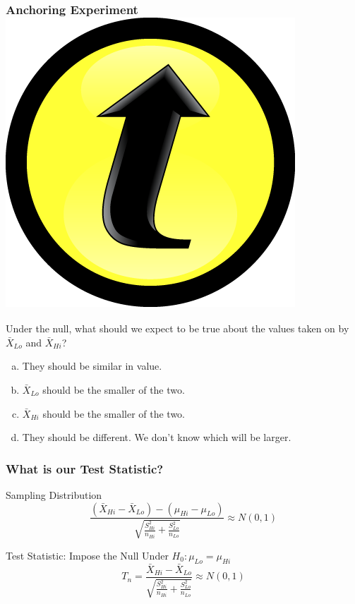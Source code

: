 \documentclass[handout]{beamer}
\begin{document}
\begin{frame}
	\frametitle{Anchoring Experiment\hfill \includegraphics[scale = 0.05]{./images/clicker}}
 
Under the null, what should we expect to be true about the values taken on by $\bar{X}_{Lo}$ and $\bar{X}_{Hi}$?

\vspace{1em}

	\begin{enumerate}[(a)]
		\item They should be similar in value.
		\item $\bar{X}_{Lo}$ should be the smaller of the two.
		\item $\bar{X}_{Hi}$ should be the smaller of the two.
		\item They should be different. We don't know which will be larger.
	\end{enumerate}
\end{frame}

\begin{frame}
\frametitle{What is our Test Statistic?}
\begin{block}{Sampling Distribution}
		$$\frac{\left(\bar{X}_{Hi} - \bar{X}_{Lo}\right) - \left(\mu_{Hi} - \mu_{Lo}\right)}{\sqrt{\frac{S_{Hi}^2}{n_{Hi}} + \frac{S_{Lo}^2}{n_{Lo}}}} \approx N(0,1)$$
\end{block}

\begin{block}{Test Statistic: Impose the Null}
Under $H_0\colon \mu_{Lo} = \mu_{Hi}$
	$$T_n =\frac{\bar{X}_{Hi} - \bar{X}_{Lo}}{\sqrt{\frac{S_{Hi}^2}{n_{Hi}} + \frac{S_{Lo}^2}{n_{Lo}}}} \approx N(0,1)$$
\end{block}
\end{frame}
\end{document}
